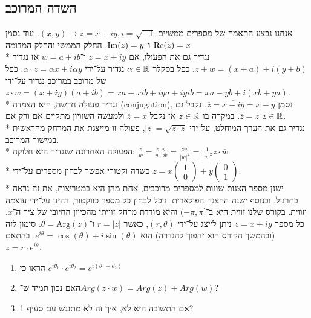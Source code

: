 \subsection{השדה המרוכב}
אנחנו נבצע התאמה של מספרים ממשיים $(x, y) \mapsto z = x + i y, i = \sqrt{-1}$.
עוד נסמן $\operatorname{Re}(z) = x$ ו־$\operatorname{Im}(z) = y$, החלק הממשי והחלק המדומה. \\*
נגדיר גם את הפעולו, אם $z = x + i y$ ו־$w = a + i b$ אז נגדיר $z \pm w = (x \pm a) + i (y \pm b)$.
כפל בסקלר $\alpha \in \mathbb{R}$ נגדיר על־ידי $\alpha \cdot z = \alpha x + i \alpha y$.
כפל של מרוכב במרוכב נגדיר על־ידי $z \cdot w = (x + i y)(a + i b) = xa + xib + iya + iy ib = xa - yb + i(xb + ya)$. \\*
נגדיר פעולה חדשה, היא הצמדה (conjugation), נסמן $\overline{z} = \overline{x + iy} = x - y$. נקבל גם $\overline{\overline{z}} = z$.
במקרה בו $z \in \mathbb{R}$ אז נקבל $\overline{z} = x$ ולמעשה השוויון מתקיים אם ורק אם $z \in \mathbb{R}$. \\*
נגדיר גם את הערך המוחלט, על־ידי $|z| = \sqrt{z \cdot \overline{z}}$, פעולה זו מייצגת את המרחק מהראשית במישור המרוכב. \\*
הפעולה האחרונה שנגדיר היא חלוקה: $\frac{z}{w} = \frac{z \cdot \overline{w}}{w \cdot \overline{w}} = \frac{z \overline{w}}{{|w|}^2} = \frac{1}{{|w|}^2} z \cdot \overline{w}$. \\*
כשדה וקטורי אפשר לבחון מספרים על־ידי $z = x \begin{pmatrix} 1 \\ 0 \end{pmatrix} + y \begin{pmatrix} 0 \\ 1 \end{pmatrix}$. \\*
ישנן מספר הצגות שונות למספרים מרוכבים, אחת מהן היא במטריצות, את זה נראה בתרגול, ובנוסף ישנה ההצגה הפולארית.
נוכל לבחון כל מספר כווקטור, דהינו על־ידי עוצמה וזווית.
בקורס שלנו זווית היא ב־$(-\pi, \pi]$ והיא מודדת מרחק זוויתי מהכיוון החיובי של ציר ה־$x$. %
כל מספר $z = x + i y$ ניתן לייצג על־ידי $(r, \theta)$, כאשר $r = |z|$ ו־$\theta = \text{Arg}(z)$.
סימון לזה (ובהמשך הקורס הוא יהפוך להגדרה) הוא $e^{i\theta} = \cos(\theta) + i \sin(\theta)$.
בהתאם $z = r \cdot e^{i\theta}$.
\begin{exercise}
	\begin{enumerate}
		\item הראו כי $e^{i \theta_1} \cdot e^{i \theta_2} = e^{i(\theta_1 + \theta_2)}$
		\item האם נכון תמיד ש־$Arg(z \cdot w) = Arg(z) + Arg(w)$?
		\item אם התשובה היא לא, איך זה לא מתנגש עם סעיף 1?
	\end{enumerate}
\end{exercise}

